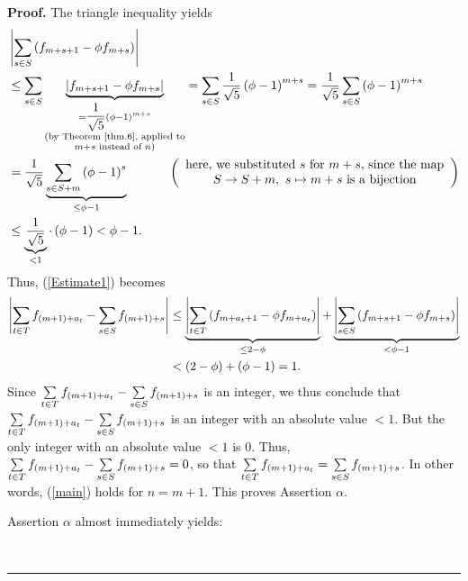 \documentclass[numbers=enddot,12pt,final,onecolumn,notitlepage]{scrartcl}%
\numberwithin{exer}{section}
\theoremstyle{definition}
\newenvironment{proof}[1][Proof]{\noindent\textbf{#1.} }{\ \rule{0.5em}{0.5em}}
\let\sumnonlimits\sum
\renewcommand{\sum}{\sumnonlimits\limits}
\begin{document}
\begin{proof}
The triangle inequality yields%
\begin{align*}
&  \left\vert \sum\limits_{s\in S}\left(  f_{m+s+1}-\phi f_{m+s}\right)
\right\vert \\
&  \leq\sum\limits_{s\in S}\underbrace{\left\vert f_{m+s+1}-\phi
f_{m+s}\right\vert }_{\substack{=\dfrac{1}{\sqrt{5}}\left(  \phi-1\right)
^{m+s}\\\text{(by Theorem~\ref{thm.6}, applied to}\\m+s\text{ instead of
}n\text{)}}}=\sum\limits_{s\in S}\dfrac{1}{\sqrt{5}}\left(  \phi-1\right)
^{m+s}=\dfrac{1}{\sqrt{5}}\sum\limits_{s\in S}\left(  \phi-1\right)  ^{m+s}\\
&  =\dfrac{1}{\sqrt{5}}\underbrace{\sum\limits_{s\in S+m}\left(
\phi-1\right)  ^{s}}_{\leq\phi-1}\ \ \ \ \ \ \ \ \ \ \left(
\begin{array}
[c]{c}%
\text{here, we substituted }s\text{ for }m+s\text{, since the map}\\
S\rightarrow S+m,\ s\mapsto m+s\text{ is a bijection}%
\end{array}
\right) \\
&  \leq\underbrace{\dfrac{1}{\sqrt{5}}}_{<1}\cdot\left(  \phi-1\right)
<\phi-1.
\end{align*}
Thus, (\ref{Estimate1}) becomes%
\begin{align}
\left\vert \sum\limits_{t\in T}f_{\left(  m+1\right)  +a_{t}}-\sum
\limits_{s\in S}f_{\left(  m+1\right)  +s}\right\vert  &  \leq
\underbrace{\left\vert \sum\limits_{t\in T}\left(  f_{m+a_{t}+1}-\phi
f_{m+a_{t}}\right)  \right\vert }_{\leq2-\phi}+\underbrace{\left\vert
\sum\limits_{s\in S}\left(  f_{m+s+1}-\phi f_{m+s}\right)  \right\vert
}_{<\phi-1}\nonumber\\
&  <\left(  2-\phi\right)  +\left(  \phi-1\right)  =1.\nonumber
\end{align}
Since $\sum\limits_{t\in T}f_{\left(  m+1\right)  +a_{t}}-\sum\limits_{s\in
S}f_{\left(  m+1\right)  +s}$ is an integer, we thus conclude that
$\sum\limits_{t\in T}f_{\left(  m+1\right)  +a_{t}}-\sum\limits_{s\in
S}f_{\left(  m+1\right)  +s}$ is an integer with an absolute value $<1$. But
the only integer with an absolute value $<1$ is $0$. Thus, $\sum\limits_{t\in
T}f_{\left(  m+1\right)  +a_{t}}-\sum\limits_{s\in S}f_{\left(  m+1\right)
+s}=0$, so that $\sum\limits_{t\in T}f_{\left(  m+1\right)  +a_{t}}%
=\sum\limits_{s\in S}f_{\left(  m+1\right)  +s}$. In other words, (\ref{main})
holds for $n=m+1$. This proves Assertion $\alpha$.

Assertion $\alpha$ almost immediately yields:


\end{proof}
\end{document}
